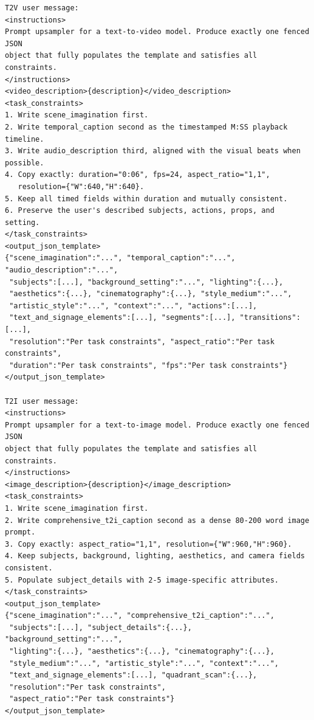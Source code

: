 \begin{tcolorbox}[
    breakable,
    colback=black!2,
    colframe=nvidiagreen!75!white,
    boxrule=0.4pt,
    arc=1pt,
    left=4pt,
    right=4pt,
    top=4pt,
    bottom=4pt,
    title=Abridged Canonical Prompt-Template Examples
]
\begin{Verbatim}[breaklines=true,breakanywhere=true,fontsize=\scriptsize]
T2V user message:
<instructions>
Prompt upsampler for a text-to-video model. Produce exactly one fenced JSON
object that fully populates the template and satisfies all constraints.
</instructions>
<video_description>{description}</video_description>
<task_constraints>
1. Write scene_imagination first.
2. Write temporal_caption second as the timestamped M:SS playback timeline.
3. Write audio_description third, aligned with the visual beats when possible.
4. Copy exactly: duration="0:06", fps=24, aspect_ratio="1,1",
   resolution={"W":640,"H":640}.
5. Keep all timed fields within duration and mutually consistent.
6. Preserve the user's described subjects, actions, props, and setting.
</task_constraints>
<output_json_template>
{"scene_imagination":"...", "temporal_caption":"...", "audio_description":"...",
 "subjects":[...], "background_setting":"...", "lighting":{...},
 "aesthetics":{...}, "cinematography":{...}, "style_medium":"...",
 "artistic_style":"...", "context":"...", "actions":[...],
 "text_and_signage_elements":[...], "segments":[...], "transitions":[...],
 "resolution":"Per task constraints", "aspect_ratio":"Per task constraints",
 "duration":"Per task constraints", "fps":"Per task constraints"}
</output_json_template>

T2I user message:
<instructions>
Prompt upsampler for a text-to-image model. Produce exactly one fenced JSON
object that fully populates the template and satisfies all constraints.
</instructions>
<image_description>{description}</image_description>
<task_constraints>
1. Write scene_imagination first.
2. Write comprehensive_t2i_caption second as a dense 80-200 word image prompt.
3. Copy exactly: aspect_ratio="1,1", resolution={"W":960,"H":960}.
4. Keep subjects, background, lighting, aesthetics, and camera fields consistent.
5. Populate subject_details with 2-5 image-specific attributes.
</task_constraints>
<output_json_template>
{"scene_imagination":"...", "comprehensive_t2i_caption":"...",
 "subjects":[...], "subject_details":{...}, "background_setting":"...",
 "lighting":{...}, "aesthetics":{...}, "cinematography":{...},
 "style_medium":"...", "artistic_style":"...", "context":"...",
 "text_and_signage_elements":[...], "quadrant_scan":{...},
 "resolution":"Per task constraints",
 "aspect_ratio":"Per task constraints"}
</output_json_template>


\end{Verbatim}
\end{tcolorbox}
